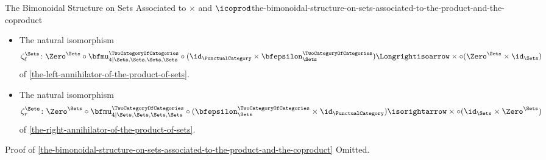 \begin{proposition}{The Bimonoidal Structure on Sets Associated to $\times$ and $\icoprod$}{the-bimonoidal-structure-on-sets-associated-to-the-product-and-the-coproduct}
\begin{itemize}
\begin{envfootnotesize}
\[            \]%
            \end{envfootnotesize}
            of \cref{the-right-distributor-of-the-product-of-sets-over-the-coproduct-of-sets}.
        \item{}The natural isomorphism
            \[
                \zeta^{\Sets}_{\ell}
                \colon
                \Zero^{\Sets}\circ\bfmu^{\TwoCategoryOfCategories}_{4|\Sets,\Sets,\Sets,\Sets}\circ(\id_{\PunctualCategory}\times\bfepsilon^{\TwoCategoryOfCategories}_{\Sets})
                \Longrightisoarrow
                \times\circ(\Zero^{\Sets}\times\id_{\Sets})
            \]%
            of \cref{the-left-annihilator-of-the-product-of-sets}.
        \item{}The natural isomorphism
            \[
                \zeta^{\Sets}_{r}
                \colon
                \Zero^{\Sets}\circ\bfmu^{\TwoCategoryOfCategories}_{4|\Sets,\Sets,\Sets,\Sets}\circ(\bfepsilon^{\TwoCategoryOfCategories}_{\Sets}\times\id_{\PunctualCategory})
                \isorightarrow
                \times\circ(\id_{\Sets}\times\Zero^{\Sets})
            \]%
            of \cref{the-right-annihilator-of-the-product-of-sets}.
    \end{itemize}
\end{proposition}
\begin{Proof}{Proof of \cref{the-bimonoidal-structure-on-sets-associated-to-the-product-and-the-coproduct}}%
    Omitted.
\end{Proof}
\begin{appendices}

\end{appendices}

